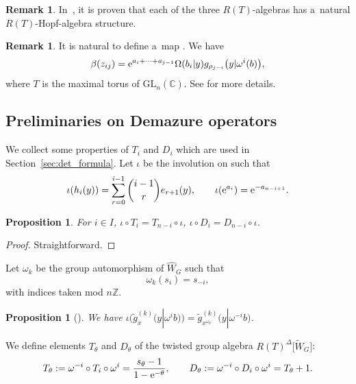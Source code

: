 \documentclass[pdftex]{sigma}
\numberwithin{equation}{section}
\newcommand{\C}{\mathbb{C}}
\newcommand{\GL}{\mathrm{GL}}
\newcommand{\reg}{\Delta}
\newcommand{\Rep}{{R(T)}}
\newcommand{\Z}{\mathbb{Z}}
\newtheorem{Proposition}[Theorem]{Proposition}
\theoremstyle{definition}
\newtheorem{Remark}[Theorem]{Remark}
\begin{document}
\begin{Remark}
In~\cite{ISY}, it is proven that
each of the three $R(T)$-algebras has a~natural $\Rep$-Hopf-algebra structure.
\end{Remark}

\begin{Remark}
It is natural to define a~map
\smash{$\beta\colon \mathscr{O}\bigl(\tilde{\mathscr{Z}}\bigr)
\rightarrow \hat{\Lambda}^\Rep$}. We have
\begin{equation}
\beta(z_{ij})= {\rm e}^{a_i+\cdots+a_{j-1}}\Omega(b_i|y)g_{\rho_{j-i}}\big(y|\omega^i(b)\big),
\label{eq:zij_in_KkSchur_GL}
\end{equation}
where $T$ is the maximal torus of $\GL_n(\C)$. See \cite[Theorem 1.2]{ISY} for more details.
\end{Remark}

\subsection{Preliminaries on Demazure operators}
We collect some properties of $T_i$ and $D_i$ which are used in Section~\ref{sec:det_formula}.
Let $\iota$ be the involution on  such that
\[
\iota(h_i(y))=\sum_{r=0}^{i-1}\binom{i-1}{r}e_{r+1}(y),\qquad
\iota({\rm e}^{a_i})={\rm e}^{-a_{n-i+1}}.
\]
\begin{Proposition}\label{prop:iota Dem}
For $i\in I$, $\iota\circ T_i=T_{n-i}\circ \iota$, $
\iota\circ D_i=D_{n-i}\circ \iota$.
\end{Proposition}
\begin{proof}
Straightforward.
\end{proof}


Let $\omega_k$ be the group automorphism of $\hat{W}_G$ such that
\begin{equation}
\label{eq:omega_k}
\omega_k(s_i)=s_{-i},
\end{equation}
with indices taken mod $n\Z$.
\begin{Proposition}[{\cite[Proposition 3.14]{ISY}}]
\label{prop:iota $K$-k}
We have
$
\iota\bigl(\tilde{g}_x^{(k)}\bigl(y|\omega^i b\bigr)\bigr)=
\tilde{g}^{(k)}_{x^{\omega_k}}\bigl(y|\omega^{-i}b\bigr)$.
\end{Proposition}

We define elements $T_{\theta}$ and $D_\theta$ of the twisted group algebra $\Rep^\reg\big[\tilde{W}_G\big]$:
\begin{equation}
\label{eq:Ttheta}
T_\theta:=\omega^{-i}\circ T_i \circ \omega^i=\frac{s_\theta-1}{1-{\rm e}^{-\theta}},\qquad
D_\theta:=\omega^{-i}\circ D_i \circ \omega^i=T_\theta+1.
\end{equation}
\end{document}
